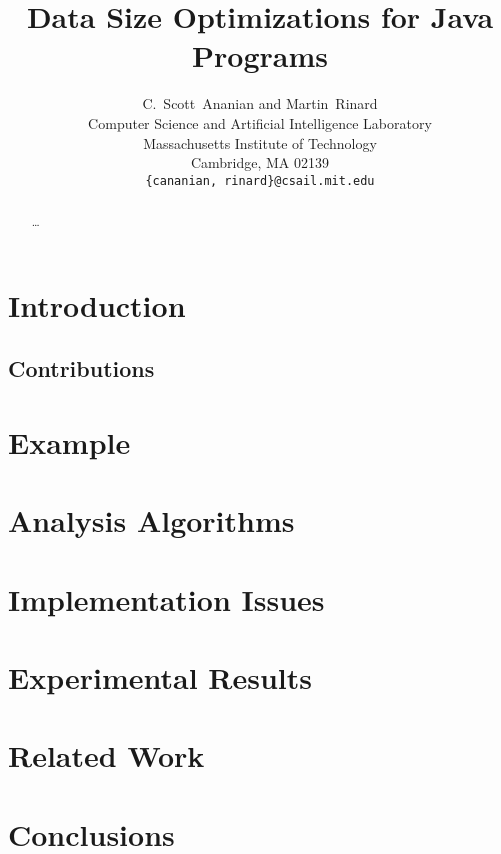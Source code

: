 \documentclass{acmconf}
\title{Data Size Optimizations for Java Programs}
\author{C.~Scott~Ananian and Martin~Rinard \\
Computer Science and Artificial Intelligence Laboratory\\
Massachusetts Institute of Technology\\ 
Cambridge, MA 02139 \\
{\tt \{cananian, rinard\}@csail.mit.edu}
}
\begin{document}

%
\maketitle
{}
%
\begin{abstract}
\ldots
\end{abstract}
%
\section{Introduction}

\subsection{Contributions}

\section{Example}

\section{Analysis Algorithms}

\section{Implementation Issues}

\section{Experimental Results}

\section{Related Work}

\section{Conclusions}

\renewcommand{\baselinestretch}{1}


%
\end{document}
